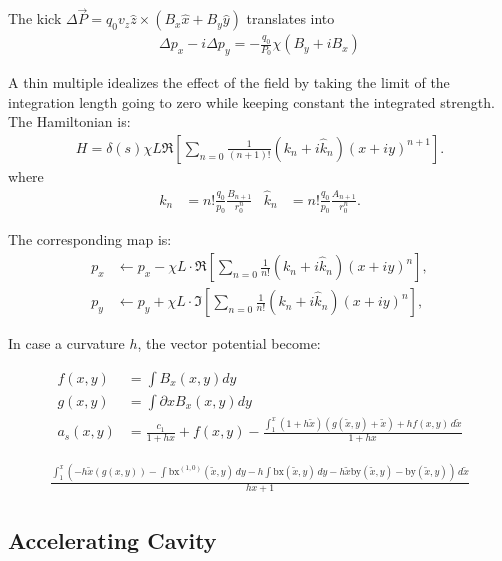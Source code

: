 The kick $\Delta \vec P  = q_0 v_z \hat z \times (B_x \hat x + B_y \hat y)$ translates into
\begin{align}
   \Delta p_x - i \Delta p_y = -\frac{q_0}{P_0}\chi(B_y + i B_x) 
\end{align}


A thin multiple idealizes the effect of the field by taking the limit of the integration 
length going to zero while keeping constant the integrated strength. The Hamiltonian is:
\begin{align}
  H= \delta(s) \chi L \Re\left[\sum_{n=0} \frac{1}{(n+1)!}(k_n + i\hat k_n) (x+iy)^{n+1} \right].
\end{align}
where
\begin{align}
  k_n     &=  n!\frac{q_0}{p_0}  \frac{B_{n+1}}{r_0^n}  &
  \hat k_n&=  n!\frac{q_0}{p_0}  \frac{A_{n+1}}{r_0^n} .
\end{align}


The corresponding map is:
\begin{align}
  p_x &\leftarrow p_x - \chi L\cdot\Re\left[\sum_{n=0} \frac{1}{n!} (k_n + i\hat k_n) (x+iy)^n \right], \\
  p_y &\leftarrow p_y + \chi L\cdot\Im\left[\sum_{n=0} \frac{1}{n!} (k_n + i\hat k_n) (x+iy)^n \right],
\end{align}

In case a curvature $h$, the vector potential become:

\begin{align}
f(x,y)&=\int B_x(x,y) dy  \\
g(x,y)&=\int \partial x  B_x(x,y) dy \\
a_s(x,y)&=\frac{c_1}{1 + h x} + f(x,y) -
   \frac{\int_1^x (1 + h \tilde{x}) (g(\tilde{x},y)+\tilde{x}) +h f(x,y)  \, d\tilde{x}}{1+ h x}
\end{align}

\begin{align}
\frac{\int_1^x \left(-h \tilde{x} \left(g(x,y)\right)-\int \text{bx}^{(1,0)}(\tilde{x},y) \, dy-h \int \text{bx}(\tilde{x},y) \,
   dy-h \tilde{x} \text{by}(\tilde{x},y)-\text{by}(\tilde{x},y)\right) \, d\tilde{x}}{h x+1}
\end{align}



\subsection{Accelerating Cavity}

